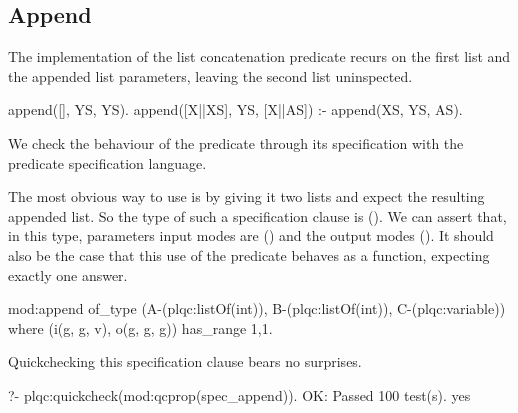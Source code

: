 

\subsection{Append}
The %
implementation of the list concatenation predicate recurs on the first list
and the appended list parameters, leaving the second list uninspected.
%
\begin{yapcode}
 append([], YS, YS).
 append([X||XS], YS, [X||AS]) :-
   append(XS, YS, AS).
\end{yapcode}
%
We check the behaviour of the  predicate
through its specification with the predicate specification language.
%


The most obvious way to use  is by giving it two lists and expect
the resulting appended list.
%
So the type of such a specification clause is
().
%
We can assert that, in this \plqc{} type, parameters input modes are
() and the output modes ().
%
It should also be the case that this use of the predicate behaves as a
function, expecting exactly one answer.
%
\begin{yapcode}
 mod:append
   of_type (A-(plqc:listOf(int)),
     B-(plqc:listOf(int)), C-(plqc:variable))
   where (i(g, g, v), o(g, g, g))
   has_range {1,1}.
\end{yapcode}
%
Quickchecking this specification clause bears no surprises.
%
\begin{yapcode}
   ?- plqc:quickcheck(mod:qcprop(spec_append)).
 OK: Passed 100 test(s).
 yes
\end{yapcode}



